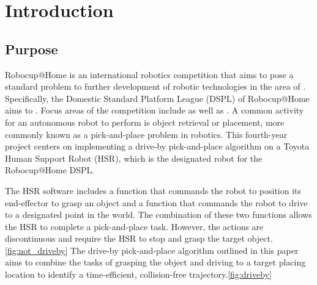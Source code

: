 \documentclass[12pt]{article}
\begin{document}
\section{Introduction }
    \subsection{Purpose}
        Robocup@Home is an international robotics competition that aims to pose a standard problem to further development of robotic technologies in the area of \cite{noauthor_robocuphome_2020}. Specifically, the Domestic Standard Platform League (DSPL) of Robocup@Home aims to \cite{noauthor_robocuphome_2020}. Focus areas of the competition include  as well as \cite{noauthor_robocuphome_2020}. A common activity for an autonomous robot to perform is object retrieval or placement, more commonly known as a pick-and-place problem in robotics. This fourth-year project centers on implementing a drive-by pick-and-place algorithm on a Toyota Human Support Robot (HSR), which is the designated robot for the Robocup@Home DSPL. 

        The HSR software includes a function that commands the robot to position its end-effector to grasp an object and a function that commands the robot to drive to a designated point in the world. The combination of these two functions allows the HSR to complete a pick-and-place task. However, the actions are discontinuous and require the HSR to stop and grasp the target object.\cref{fig:not_driveby} The drive-by pick-and-place algorithm outlined in this paper aims to combine the tasks of grasping the object and driving to a target placing location to identify a time-efficient, collision-free trajectory.\cref{fig:driveby}
    
\end{document}
